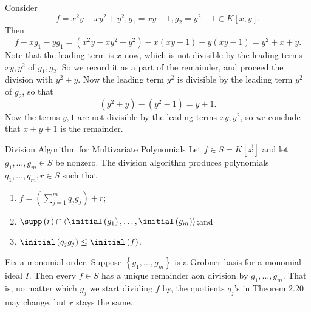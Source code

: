 \documentclass[co439]{subfiles}
\begin{document}
    \begin{example}{}
        Consider
        \begin{equation*}
            f = x^{2}y + xy^{2}+y^{2}, g_1=xy-1, g_2=y^{2}-1\in K\left[ x,y \right].
        \end{equation*}
        Then
        \begin{equation*}
            f - xg_1 - yg_1 = \left( x^{2}y+xy^{2}+y^{2} \right) - x\left( xy-1 \right) - y\left( xy-1 \right) = y^{2}+x+y.
        \end{equation*}
        Note that the leading term is $x$ now, which is not divisible by the leading terms $xy, y^{2}$ of $g_1,g_2$. So we record it as a part of the remainder, and proceed the division with $y^{2}+y$. Now the leading term $y^{2}$ is divisible by the leading term $y^{2}$ of $g_2$, so that
        \begin{equation*}
            \left( y^{2}+y \right) - \left( y^{2}-1 \right) = y+1.
        \end{equation*}
        Now the terms $y,1$ are not divisible by the leading terms $xy, y^{2}$, so we conclude that $x+y+1$ is the remainder.
    \end{example}

    \rruleline

    \begin{theorem}{Division Algorithm for Multivariate Polynomials}
        Let $f\in S=K\left[ \vec{x} \right]$ and let $g_1,\ldots,g_m\in S$ be nonzero. The division algorithm produces polynomials $q_1,\ldots,q_m,r\in S$ such that
        \begin{enumerate}
            \item $f = \left( \sum^{m}_{j=1}q_jg_j \right) + r$;
            \item $\supp\left( r \right)\cap\left< \initial\left( g_1 \right),\ldots,\initial\left( g_m \right) \right>$;\footnotemark[1] and
            \item $\initial\left( q_jg_j \right)\leq\initial\left( f \right)$.
        \end{enumerate}
        
        \noindent
        \begin{minipage}{\textwidth}
        \end{minipage}
    \end{theorem}

    \rruleline

    \begin{theorem}{}
        Fix a monomial order. Suppose $\left\lbrace g_1,\ldots,g_m \right\rbrace$ is a Grobner basis for a monomial ideal $I$. Then every $f\in S$ has a unique remainder aon division by $g_1,\ldots,g_m$. That is, no matter which $g_j$ we start dividing $f$ by, the quotients $q_j$'s in Theorem 2.20 may change, but $r$ stays the same.
    \end{theorem}
\end{document}
